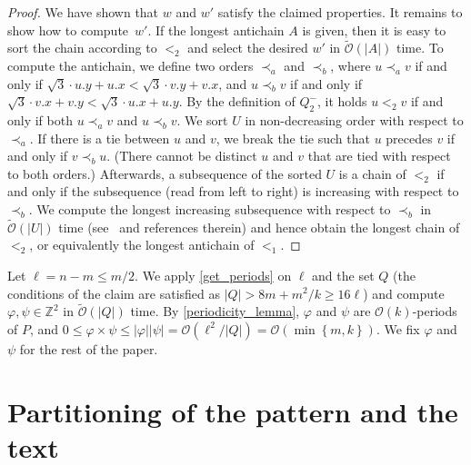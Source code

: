 \documentclass[a4paper,11pt]{article}
\let\Cref\cref
\newcommand{\Z}{\mathbb{Z}}
\renewcommand{\O}{\mathcal{O}}
\newcommand{\tO}{\tilde{\mathcal{O}}}
\renewcommand{\phi}{\varphi}
\newcommand{\set}[1]{\left\lbrace #1 \right\rbrace}
\newcommand{\absolute}[1]{\left\lvert#1\right\rvert}
\begin{document}
\begin{proof}
We have shown that $w$ and $w'$ satisfy the claimed properties. 
It remains to show how to compute~$w'$. 
If the longest antichain $A$ is given, then it is easy to sort the chain according to $<_2$ and select the desired $w'$ in $\tO(\absolute{A})$ time. To compute the antichain, 
we define two orders $\prec_a$ and $\prec_b$, where 
$u \prec_a v$ if and only if $\sqrt{3} \cdot u.y + u.x < \sqrt{3} \cdot v.y + v.x$, and $u \prec_b v$ if and only if $\sqrt{3} \cdot v.x + v.y < \sqrt{3} \cdot u.x + u.y$.
By the definition of $Q_2^-$, it holds $u <_2 v$ if and only if both $u \prec_a v$ and $u \prec_b v$.
We sort $U$ in non-decreasing order with respect to $\prec_a$. If there is a tie between $u$ and $v$, we break the tie such that $u$ precedes $v$ if and only if $v \prec_b u$. (There cannot be distinct $u$ and $v$ that are tied with respect to both orders.) 
Afterwards, a subsequence of the sorted $U$ is a chain of $<_2$ if and only if the subsequence (read from left to right) is increasing with respect to $\prec_b$.
We compute the longest increasing subsequence with respect to $\prec_b$ in $\tO(\absolute{U})$ time (see~\cite{CROCHEMORE20101054} and references therein) and hence obtain the longest chain of $<_2$, or equivalently the longest antichain of $<_1$.
\end{proof}

Let $\ell = n - m \le m / 2$. We apply \Cref{get_periods} on $\ell$ and the set $Q$ (the conditions of the claim are satisfied as $\absolute{Q} > 8m + m^2/k \ge 16\ell$) and compute $\phi, \psi \in \Z^2$ in $\tO(\absolute{Q})$ time. By \Cref{periodicity_lemma}, $\phi$ and $\psi$ are $\O(k)$-periods of $P$, and $0 \le \phi \times \psi \le \absolute{\phi}\absolute{\psi} = \O(\ell^2 / \absolute{Q}) =  \O(\min\set{m, k})$. We fix $\phi$ and $\psi$ for the rest of the paper.


\section{Partitioning of the pattern and the text}
\label{sec:partition}
\end{document}
